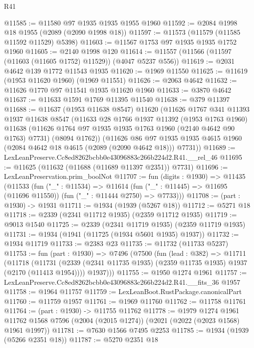 \begin{lexlean}{R41}
\begin{coremodule}
@11585 := @11580 @97 @1935 @1935 @1955 @1960
@11592 := @2084 @1998 @18 @1955 (@2089 (@2090 @1998 @18))
@11597 := @11573 (@11579 (@11585 @11592 @11529) @5398)
@11603 := @11567 @1753 @97 @1935 @1935 @1752 @1960
@11605 := @2140 @1998 @120
@11614 := @11557 (@11566 (@11597 (@11603 (@11605 @1752) @11529)) (@4047 @5237 @556))
@11619 := @2031 @4642 @139 @1772 @11543 @1935
@11620 := @1969 @11550
@11625 := @11619 (@1953 @11620 @1960) (@1969 @11551)
@11626 := @2063 @4642
@11632 := @11626 @1770 @97 @11541 @1935 @11620 @1960
@11633 := @3870 @4642
@11637 := @11633 @1591 @1769 @11395 @11540
@11638 := @379 @11397
@11688 := @11637
    (@1953 @11638 @8547)
    @11620
    (@11626
      @1767
      @341
      @11393
      @1937
      @11638
      @8547
      (@11633
        @28
        @1766
        @1937
        @11392
        (@1953 @1763 @1960)
        @11638
        (@11626 @1764 @97 @1935 @1935 @1763 @1960 (@2140 @4642 @90 @1763) @7731)
        (@8094 @1762))
      (@11626
        @86
        @97
        @1935
        @1935
        @4615
        @1960
        (@2084 @4642 @18 @4615 (@2089 (@2090 @4642 @18)))
        @7731))
@11689 := LexLeanPreserve.Cc8ed8262bcbb0e43096883c266b224d2.R41.__rel_46
@11695 := @11625 (@11632 (@11688 (@11689 @11397 @2351)) @7731)
@11696 := LexLeanPreservation.prim_boolNot
@11707 := fun (digits : @1930) =>
  @11435
    (@11533
      (fun ("_" : @11534) =>
      @11614 (fun ("_" : @11445) => @11695 (@11696 @11550)) (fun ("_" : @11444 @2750) => @7733)))
@11708 := (part : @1930) -> @1931
@11711 := @1934 (@1939 (@5267 @18))
@11712 := @5271 @18
@11718 := @2339 (@2341 @11712 @1935) (@2359 @11712 @1935)
@11719 := @9013 @1540
@11725 := @2339 (@2341 @11719 @1935) (@2359 @11719 @1935)
@11731 := @1934 (@1941 (@11725 (@1934 @5601 @1935) @1937))
@11732 := @1934 @11719
@11733 := @2383 @23
@11735 := @11732 (@11733 @5237)
@11753 := fun (part : @1930) =>
  @7496
    (@7500
      (fun (lead : @382) =>
      @11711
        (@11718
          (@11731 (@2339 (@2341 @11735 @1935) (@2359 @11735 @1935) @1937 (@2170 (@11413 @1954))))
          @1937)))
@11755 := @1950 @1274 @1961
@11757 := LexLeanPreserve.Cc8ed8262bcbb0e43096883c266b224d2.R41.__fits_36 @1957
@11758 := @1964 @11757
@11759 := LexLeanBoot.RustPackage.canonicalPart
@11760 := @11759 @1957
@11761 := @1969 @11760
@11762 := @11758 @11761
@11764 := (part : @1930) -> @11755 @11762
@11778 := @1979
    @1274
    @1961
    @11762
    @1568
    @7596
    (@2004 (@2015 @1274))
    (@2021 (@2022 (@2023 @1568) @1961 @1997))
@11781 := @7630 @1566 @7495 @2253
@11785 := @1934 (@1939 (@5266 @2351 @18))
@11787 := @5270 @2351 @18

\end{coremodule}
\end{lexlean}
